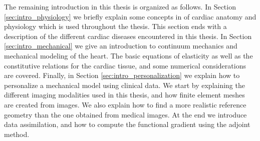 The remaining introduction in this thesis is organized as follows. In
Section \ref{sec:intro_physiology} we briefly explain some concepts in of
cardiac anatomy and physiology which is used throughout the
thesis. This section ends with a description of the different cardiac
diseases encountered in this thesis. In Section
\ref{sec:intro_mechanical} we give an introduction to continuum
mechanics and mechanical modeling of the heart. The basic equations of
elasticity as well as the constitutive relations for the cardiac
tissue, and some numerical considerations are covered. Finally, in Section 
\ref{sec:intro_personalization} we explain how to personalize a
mechanical model using clinical data. We start by explaining the
different imaging modalities used in this thesis, and how finite
element meshes are created from images. We also explain how to find a
more realistic reference geometry than the one obtained from medical
images. At the end we introduce data assimilation, and how to compute
the functional gradient using the adjoint method. 

\newpage







% 

\newpage

\newpage

\newpage



\newpage






